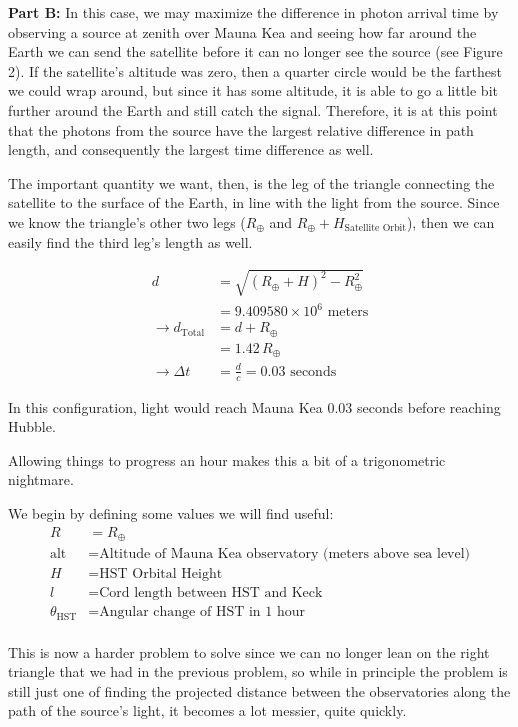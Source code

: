 \documentclass[12pt]{article}
\begin{document}
\begin{onehalfspacing}
\raggedright{\textbf{\large Part B: }}
In this case, we may maximize the difference in photon arrival time by observing a source at zenith over Mauna Kea and seeing how far around the Earth we can send the satellite before it can no longer see the source (see Figure 2). If the satellite's altitude was zero, then a quarter circle would be the farthest we could wrap around, but since it has some altitude, it is able to go a little bit further around the Earth and still catch the signal. Therefore, it is at this point that the photons from the source have the largest relative difference in path length, and consequently the largest time difference as well. \bigskip

The important quantity we want, then, is the leg of the triangle connecting the satellite to the surface of the Earth, in line with the light from the source. Since we know the triangle's other two legs ($R_{\oplus}$ and $R_{\oplus} + H_{\text{Satellite Orbit}}$), then we can easily find the third leg's length as well.

\begin{align*}
  d &= \sqrt{(R_{\oplus} + H)^2 - R_{\oplus}^2} \\
    &= 9.409580 \times 10^6 \text{ meters} \\
  \rightarrow d_{\text{Total}} &= d + R_{\oplus} \\
                   &= 1.42\, R_{\oplus} \\
  \rightarrow \Delta t &= \frac{d}{c} = 0.03 \text{ seconds}
\end{align*}

In this configuration, light would reach Mauna Kea 0.03 seconds before reaching Hubble. \bigskip

Allowing things to progress an hour makes this a bit of a trigonometric nightmare.

We begin by defining some values we will find useful:
\begin{align*}
  R &= R_{\oplus}\\
  \text{alt} &= \text{Altitude of Mauna Kea observatory (meters above sea level)} \\
  H &= \text{HST Orbital Height} \\
  l &= \text{Cord length between HST and Keck}\\
  \theta_{\text{HST}} &= \text{Angular change of HST in 1 hour} \\
\end{align*}

This is now a harder problem to solve since we can no longer lean on the right triangle that we had in the previous problem, so while in principle the problem is still just one of finding the projected distance between the observatories along the path of the source's light, it becomes a lot messier, quite quickly. \bigskip


\end{onehalfspacing}
\end{document}
